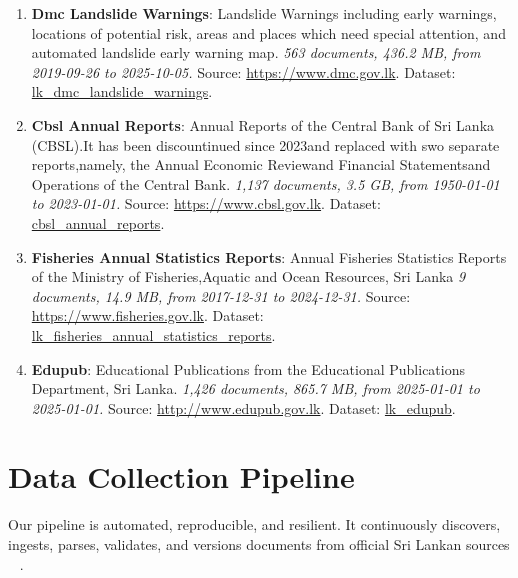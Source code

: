 \documentclass[10pt,a4paper]{article}%
\begin{document}
\begin{enumerate}
\item%
\textbf{Dmc Landslide Warnings}: Landslide Warnings including early warnings, locations of potential risk, areas and places which need special attention, and automated landslide early warning map.\textit{ 563 documents, 436.2 MB, from 2019{-}09{-}26 to 2025{-}10{-}05.} Source: \href{https://www.dmc.gov.lk}{https://www.dmc.gov.lk}. Dataset: \href{https://github.com/nuuuwan/lk\_dmc/tree/data\_lk\_dmc\_landslide\_warnings/data/lk\_dmc\_landslide\_warnings}{lk\_dmc\_landslide\_warnings}.%
\item%
\textbf{Cbsl Annual Reports}: Annual Reports of the Central Bank of Sri Lanka (CBSL).It has been discountinued since 2023and replaced with swo separate reports,namely, the Annual Economic Reviewand Financial Statementsand Operations of the Central Bank.\textit{ 1,137 documents, 3.5 GB, from 1950{-}01{-}01 to 2023{-}01{-}01.} Source: \href{https://www.cbsl.gov.lk}{https://www.cbsl.gov.lk}. Dataset: \href{https://github.com/nuuuwan/cbsl/tree/data\_cbsl\_annual\_reports/data/cbsl\_annual\_reports}{cbsl\_annual\_reports}.%
\item%
\textbf{Fisheries Annual Statistics Reports}: Annual Fisheries Statistics Reports of the Ministry of Fisheries,Aquatic and Ocean Resources, Sri Lanka\textit{ 9 documents, 14.9 MB, from 2017{-}12{-}31 to 2024{-}12{-}31.} Source: \href{https://www.fisheries.gov.lk}{https://www.fisheries.gov.lk}. Dataset: \href{https://github.com/nuuuwan/lk\_fisheries/tree/data\_lk\_fisheries\_annual\_statistics\_reports/data/lk\_fisheries\_annual\_statistics\_reports}{lk\_fisheries\_annual\_statistics\_reports}.%
\item%
\textbf{Edupub}: Educational Publications from the Educational Publications Department, Sri Lanka.\textit{ 1,426 documents, 865.7 MB, from 2025{-}01{-}01 to 2025{-}01{-}01.} Source: \href{http://www.edupub.gov.lk}{http://www.edupub.gov.lk}. Dataset: \href{https://github.com/nuuuwan/lk\_edupub/tree/data/data/lk\_edupub}{lk\_edupub}.%
\end{enumerate}

%
\section{Data Collection Pipeline}%
\label{sec:DataCollectionPipeline}%
Our pipeline is automated, reproducible, and
 resilient. It continuously discovers, ingests,
 parses, validates, and versions documents from
 official Sri Lankan sources%
~%
\citep{MLOpsSurvey2022}%
.%
\end{document}
